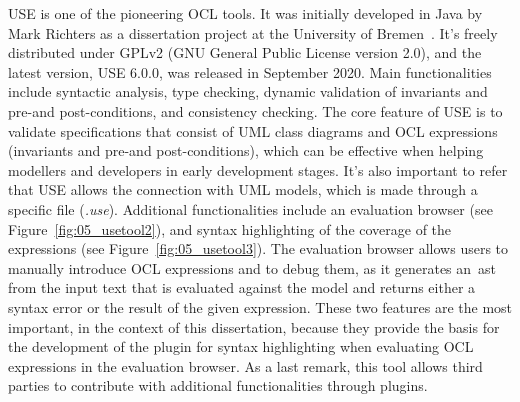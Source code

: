 

USE is one of the pioneering OCL tools. It was initially developed in Java by Mark Richters as a dissertation project at the University of Bremen~\cite{Gogolla2007}. It's freely distributed under GPLv2 (GNU General Public License version 2.0), and the latest version, USE 6.0.0, was released in September 2020. Main functionalities include syntactic analysis, type checking, dynamic validation of invariants and pre-and post-conditions, and consistency checking. The core feature of USE is to validate specifications that consist of UML class diagrams and OCL expressions (invariants and pre-and post-conditions), which can be effective when helping modellers and developers in early development stages. It's also important to refer that USE allows the connection with UML models, which is made through a specific file (\textit{.use}). Additional functionalities include an evaluation browser (see Figure~\ref{fig:05_usetool2}), and syntax highlighting of the coverage of the expressions (see Figure~\ref{fig:05_usetool3}). The evaluation browser allows users to manually introduce OCL expressions and to debug them, as it generates an~\gls{ast} from the input text that is evaluated against the model and returns either a syntax error or the result of the given expression. These two features are the most important, in the context of this dissertation, because they provide the basis for the development of the plugin for syntax highlighting when evaluating OCL expressions in the evaluation browser. As a last remark, this tool allows third parties to contribute with additional functionalities through plugins.

